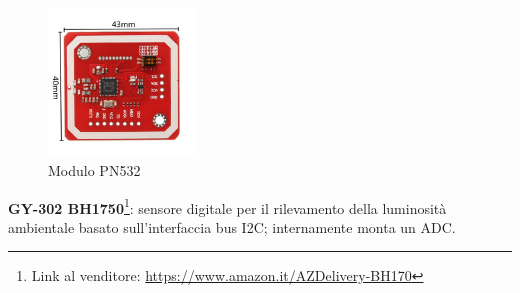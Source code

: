     \begin{figure}[H]
        \begin{center}
          \includegraphics[width=0.35\textwidth]{images/sensors/pn532.png}
        \end{center}
        \caption{\label{pn532}Modulo PN532}
    \end{figure}
    
    
\textbf{GY-302 BH1750}\footnote{Link al venditore: \href{https://www.amazon.it/AZDelivery-Sensore-Intensità-Luminosità-Raspberry/dp/B07NLL4SCB}{https://www.amazon.it/AZDelivery-BH170}}: sensore digitale per il rilevamento della luminosità ambientale basato sull'interfaccia bus I2C; internamente monta un ADC. 

